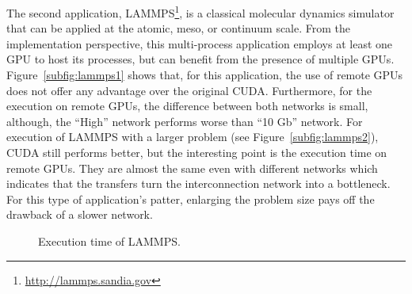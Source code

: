 \documentclass[a4paper,twoside]{article}
\begin{document}
The second application, LAMMPS\footnote{\url{http://lammps.sandia.gov}}, 
is a classical molecular dynamics simulator that can be applied at the atomic, 
meso, or continuum scale. 
From the implementation perspective, this multi-process application employs 
at least one GPU to host its processes, but can benefit from the presence of multiple GPUs.
Figure~\ref{subfig:lammps1} shows that, for this application, the use of remote GPUs 
does not offer any advantage over the original CUDA. 
Furthermore, for the execution on remote GPUs, the difference between both networks is small, although, the ``High'' network performs worse than ``10 Gb'' network.
For execution of LAMMPS with a larger problem (see Figure~\ref{subfig:lammps2}), CUDA still performs better, but the interesting point is the execution time on remote GPUs. 
They are almost the same even with different networks which indicates that the transfers turn the interconnection network into a bottleneck. For this type of application's 
patter, enlarging the problem size pays off the drawback of a slower network.

\begin{figure}[htb]
\centering
{}
\quad
{}
\caption{Execution time of LAMMPS.}
\label{fig:lammps}
\end{figure}
\end{document}
